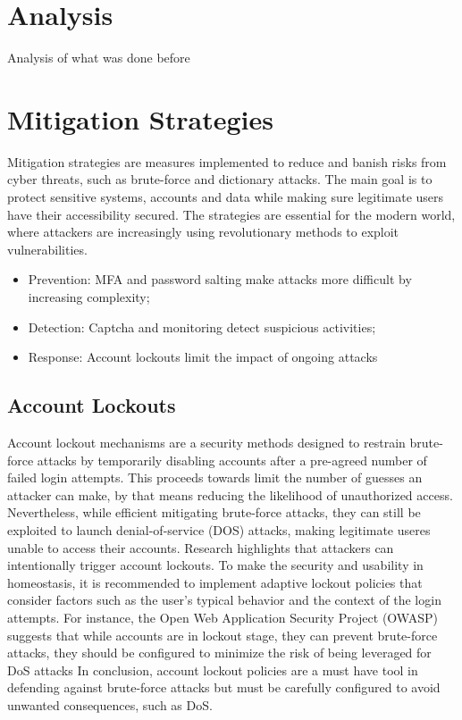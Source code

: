 \documentclass{comjnl}
\begin{document}
\section{Analysis}

Analysis of what was done before

\section{Mitigation Strategies}
Mitigation strategies are measures implemented to reduce and banish risks from cyber threats, such as brute-force and dictionary attacks. The main goal is to protect sensitive systems, accounts and data while making sure legitimate users have their accessibility secured. The strategies are essential for the modern world, where attackers are increasingly using revolutionary methods to exploit vulnerabilities.


\begin{itemize}
  \item Prevention: MFA and password salting make attacks more difficult by increasing complexity;
  \item Detection: Captcha and monitoring detect suspicious activities;
  \item Response: Account lockouts limit the impact of ongoing attacks
\end{itemize}

\subsection{Account Lockouts}
Account lockout mechanisms are a security methods designed to restrain brute-force attacks by temporarily disabling accounts after a pre-agreed number of failed login attempts. This proceeds towards limit the number of guesses an attacker can make, by that means reducing the likelihood of unauthorized access. Nevertheless, while efficient mitigating brute-force attacks, they can still be exploited to launch denial-of-service (DOS) attacks, making legitimate useres unable to access their accounts. Research highlights that attackers can intentionally trigger account lockouts.\cite{account_lockout_dos} To make the security and usability in homeostasis, it is recommended to implement adaptive lockout policies that consider factors such as the user's typical behavior and the context of the login attempts. For instance, the Open Web Application Security Project (OWASP) suggests that while accounts are in lockout stage, they can prevent brute-force attacks, they should be configured to minimize the risk of being leveraged for DoS attacks \cite{blocking_brute_force} In conclusion, account lockout policies are a must have tool in defending against brute-force attacks but must be carefully configured to avoid unwanted consequences, such as DoS.
\end{document}
